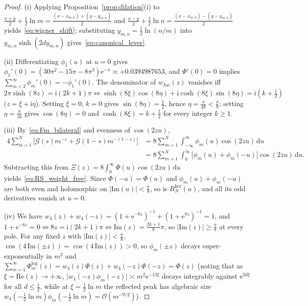 \documentclass[11pt,reqno]{amsart}
\theoremstyle{definition}
\theoremstyle{remark}
\numberwithin{equation}{section}
\newcommand{\dd}{\mathrm{d}}
\newcommand{\ii}{\mathrm{i}}
\newcommand{\ee}{\mathrm{e}}
\newcommand{\Rea}{\mathrm{Re}}
\newcommand{\Ima}{\mathrm{Im}}
\begin{document}
\begin{proof}
(i) Applying Proposition~\ref{prop:dilation}(i) to $\frac{x+y}{2} + \frac{1}{2}\ln m = \frac{(x-x_{m,n})+(y-y_{m,n})}{2}$ and $\frac{x-y}{2} + \frac{1}{2}\ln n = \frac{(x-x_{m,n})-(y-y_{m,n})}{2}$ yields~\eqref{eq:wigner_shift}; substituting $y_{m,n} = \frac{1}{2}\ln(n/m)$ into $y_{m,n}\sinh(2dy_{m,n})$ gives~\eqref{eq:canonical_lever}.

(ii) Differentiating $\phi_1(u)$ at $u = 0$ gives $\phi_1'(0) = (30\pi^2 - 15\pi - 8\pi^3)\ee^{-\pi} \approx +0.0394987653$, and $\Phi'(0) = 0$ implies $\sum_{m=2}^{\infty} \phi_m'(0) = -\phi_1'(0)$. The denominator of $w_{\mathrm{Jac}}(z)$ vanishes iff $2\pi\sinh(8z) = \ii(2k+1)\pi \iff \sinh(8\xi)\cos(8\eta) + \ii\cosh(8\xi)\sin(8\eta) = \ii(k + \frac{1}{2})$ ($z = \xi + \ii\eta$). Setting $\xi = 0$, $k = 0$ gives $\sin(8\eta) = \frac{1}{2}$, hence $\eta = \frac{\pi}{48} < \frac{\pi}{8}$; setting $\eta = \frac{\pi}{16}$ gives $\cos(8\eta) = 0$ and $\cosh(8\xi) = k + \frac{1}{2}$ for every integer $k \ge 1$.

(iii) By~\eqref{eq:Fm_bilateral} and evenness of $\cos(2zu)$,
\begin{align*}
4\sum_{m=1}^N \bigl[\mathcal{G}(s)m^{-s} + \mathcal{G}(1-s)m^{-(1-s)}\bigr] &= 8\sum_{m=1}^N \int_{-\infty}^{\infty} \phi_m(u)\cos(2zu)\,\dd u \\
&= 8\sum_{m=1}^N \int_0^{\infty} \bigl[\phi_m(u) + \phi_m(-u)\bigr]\cos(2zu)\,\dd u.
\end{align*}
Subtracting this from $\Xi(z) = 8\int_0^{\infty} \Phi(u)\cos(2zu)\,\dd u$ yields~\eqref{eq:RS_weight_free}. Since $\Phi(-u) = \Phi(u)$ and $\phi_m(u) + \phi_m(-u)$ are both even and holomorphic on $\lvert\Ima(u)\rvert < \frac{\pi}{8}$, so is $R_N^{\mathrm{ker}}(u)$, and all its odd derivatives vanish at $u = 0$.

(iv) We have $w_4(z) + w_4(-z) = (1 + \ee^{-8z})^{-1} + (1 + \ee^{8z})^{-1} = 1$, and $1 + \ee^{-8z} = 0 \iff 8z = \ii(2k+1)\pi \iff \Ima(z) = \frac{2k+1}{8}\pi$, so $\lvert\Ima(z)\rvert \ge \frac{\pi}{8}$ at every pole. For any fixed $z$ with $\lvert\Ima(z)\rvert < \frac{\pi}{8}$, $\cos(4\,\Ima(\pm z)) = \cos(4\,\Ima(z)) > 0$, so $\phi_m(\pm z)$ decays super-exponentially in $m^2$ and $\sum_{m=1}^{\infty} \Phi_m^{\mathrm{log}}(z) = w_4(z)\Phi(z) + w_4(-z)\Phi(-z) = \Phi(z)$ (noting that as $\xi = \Rea(z) \to +\infty$, $\lvert w_4(-z)\phi_m(-z)\rvert \asymp m^2\ee^{-13\xi}$ decays integrably against $\ee^{2d\xi}$ for all $d \le \frac{1}{2}$, while at $\xi = \frac{1}{2}\ln m$ the reflected peak has algebraic size $w_4(-\frac{1}{2}\ln m)\phi_m(-\frac{1}{2}\ln m) = \mathcal{O}(m^{-9/2})$).
\end{proof}
\end{document}
